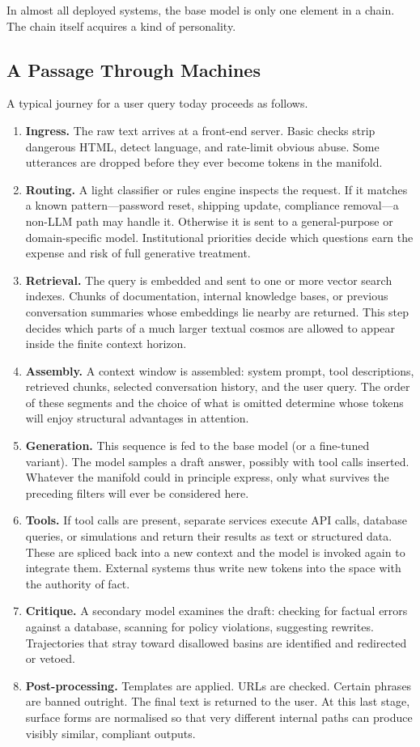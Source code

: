 \documentclass[12pt,a4paper]{article}
\begin{document}
In almost all deployed systems, the base model is only one element in a chain. The chain itself acquires a kind of personality.

\subsection{A Passage Through Machines}

A typical journey for a user query today proceeds as follows.

\begin{enumerate}
\item \textbf{Ingress.} The raw text arrives at a front-end server. Basic checks strip dangerous HTML, detect language, and rate-limit obvious abuse. Some utterances are dropped before they ever become tokens in the manifold.
\item \textbf{Routing.} A light classifier or rules engine inspects the request. If it matches a known pattern---password reset, shipping update, compliance removal---a non-LLM path may handle it. Otherwise it is sent to a general-purpose or domain-specific model. Institutional priorities decide which questions earn the expense and risk of full generative treatment.
\item \textbf{Retrieval.} The query is embedded and sent to one or more vector search indexes. Chunks of documentation, internal knowledge bases, or previous conversation summaries whose embeddings lie nearby are returned. This step decides which parts of a much larger textual cosmos are allowed to appear inside the finite context horizon.
\item \textbf{Assembly.} A context window is assembled: system prompt, tool descriptions, retrieved chunks, selected conversation history, and the user query. The order of these segments and the choice of what is omitted determine whose tokens will enjoy structural advantages in attention.
\item \textbf{Generation.} This sequence is fed to the base model (or a fine-tuned variant). The model samples a draft answer, possibly with tool calls inserted. Whatever the manifold could in principle express, only what survives the preceding filters will ever be considered here.
\item \textbf{Tools.} If tool calls are present, separate services execute API calls, database queries, or simulations and return their results as text or structured data. These are spliced back into a new context and the model is invoked again to integrate them. External systems thus write new tokens into the space with the authority of fact.
\item \textbf{Critique.} A secondary model examines the draft: checking for factual errors against a database, scanning for policy violations, suggesting rewrites. Trajectories that stray toward disallowed basins are identified and redirected or vetoed.
\item \textbf{Post-processing.} Templates are applied. URLs are checked. Certain phrases are banned outright. The final text is returned to the user. At this last stage, surface forms are normalised so that very different internal paths can produce visibly similar, compliant outputs.
\end{enumerate}
\end{document}
